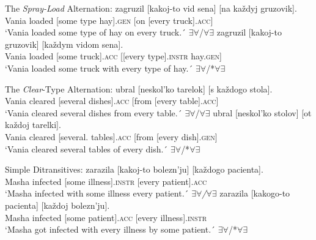 \documentclass[output=paper,colorlinks,citecolor=brown,nonflat]{./langscibook}
\begin{document}
\ea%
    \label{ex:antonyuk:4}
    The \textit{Spray-Load} Alternation:
    \ea \label{ex:antonyuk:4a}
     {zagruzil} {[kakoj-to}    {vid}   {sena]}       {[na}  {každyj} {gruzovik]}.\\
    Vania loaded   [some   type hay].\textsc{gen} [on [every  truck].\textsc{acc}]\\
    \glt `Vania loaded some type of hay on every truck.´ \hfill ${\exists}{\forall}$/${\forall}{\exists}$
    \ex \label{ex:antonyuk:4b}
     {zagruzil} {[kakoj-to} {gruzovik]}    {[každym} {vidom}          {sena]}.\\
    Vania loaded  [some       truck].\textsc{acc} [[every    type].\textsc{instr}  hay.\textsc{gen}]\\
    \glt `Vania loaded some truck with every type of hay.´ \hfill ${\exists}{\forall}$/*${\forall}{\exists}$
    \z
\z



\ea%
    \label{ex:antonyuk:5}
    The \textit{Clear}-Type Alternation:
    \ea \label{ex:antonyuk:5a}
     {ubral}    {[neskol’ko}  {tarelok]}      {[s}        {každogo} {stola]}.\\
    Vania cleared [several      dishes].\textsc{acc} [from [every      table].\textsc{acc]}\\
    \glt `Vania cleared several dishes from every table.´ \hfill ${\exists}{\forall}$/${\forall}{\exists}$
    \ex \label{ex:antonyuk:5b}
     {ubral}   {[neskol’ko} {stolov]}      {[ot}    {každoj} {tarelki]}.\\
    Vania cleared [several.     tables].\textsc{acc}  [from  [every  dish].\textsc{gen}]\\
    \glt `Vania cleared several tables of every dish.´ \hfill ${\exists}{\forall}$/*${\forall}{\exists}$
    \z
\z


\ea%
    \label{ex:antonyuk:6}
    Simple Ditransitives:
    \ea \label{ex:antonyuk:6a}
       {zarazila} {[kakoj-to} {bolezn’ju]}  {[každogo} {pacienta]}.\\
    Masha infected [some      illness].\textsc{instr}   [every     patient].\textsc{acc}\\
    \glt `Masha infected with some illness every patient.´ \hfill \textit{${\exists}{\forall}$/${\forall}{\exists}$}
    \ex \label{ex:antonyuk:6b}
       {zarazila} {[kakogo-to} {pacienta]}   {[každoj} {bolezn’ju]}.\\
    Masha infected [some         patient].\textsc{acc}   [every  illness].\textsc{instr}\\
    \glt `Masha got infected with every illness by some patient.´ \hfill ${\exists}{\forall}$/*${\forall}{\exists}$
    \z
\z
\end{document}

